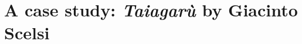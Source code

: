 \documentclass[mode=\printmode,compress,xcolor=dvipsnames]{beamer}
\begin{document}
\section[Taiagar\`u]{A case study: {\it Taiagar\`u} by Giacinto Scelsi}
% 
% 
% 
% 
% 
% 
% 
% 
% 
% 
% 
% 
% 
% 
% 
% 
% 
% 
% 
% 
\end{document}
